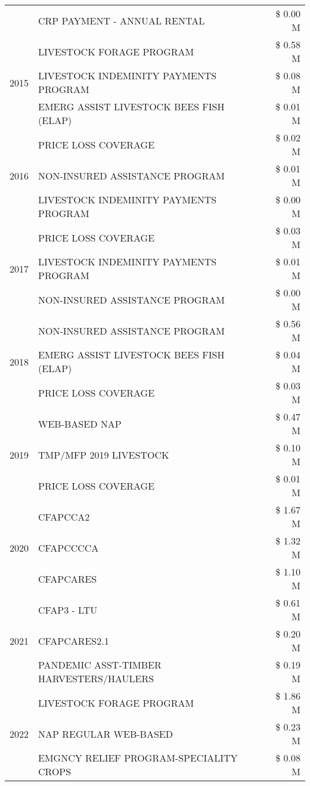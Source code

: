 \begin{tabular}{llr}
 & CRP PAYMENT - ANNUAL RENTAL & \$ 0.00 M \\
\cline{1-3}
\multirow[t]{3}{*}{2015} & LIVESTOCK FORAGE PROGRAM & \$ 0.58 M \\
 & LIVESTOCK INDEMINITY PAYMENTS PROGRAM & \$ 0.08 M \\
 & EMERG ASSIST LIVESTOCK BEES FISH (ELAP) & \$ 0.01 M \\
\cline{1-3}
\multirow[t]{3}{*}{2016} & PRICE LOSS COVERAGE & \$ 0.02 M \\
 & NON-INSURED ASSISTANCE PROGRAM & \$ 0.01 M \\
 & LIVESTOCK INDEMINITY PAYMENTS PROGRAM & \$ 0.00 M \\
\cline{1-3}
\multirow[t]{3}{*}{2017} & PRICE LOSS COVERAGE & \$ 0.03 M \\
 & LIVESTOCK INDEMINITY PAYMENTS PROGRAM & \$ 0.01 M \\
 & NON-INSURED ASSISTANCE PROGRAM & \$ 0.00 M \\
\cline{1-3}
\multirow[t]{3}{*}{2018} & NON-INSURED ASSISTANCE PROGRAM & \$ 0.56 M \\
 & EMERG ASSIST LIVESTOCK BEES FISH (ELAP) & \$ 0.04 M \\
 & PRICE LOSS COVERAGE & \$ 0.03 M \\
\cline{1-3}
\multirow[t]{3}{*}{2019} & WEB-BASED NAP & \$ 0.47 M \\
 & TMP/MFP 2019 LIVESTOCK & \$ 0.10 M \\
 & PRICE LOSS COVERAGE & \$ 0.01 M \\
\cline{1-3}
\multirow[t]{3}{*}{2020} & CFAPCCA2 & \$ 1.67 M \\
 & CFAPCCCCA & \$ 1.32 M \\
 & CFAPCARES & \$ 1.10 M \\
\cline{1-3}
\multirow[t]{3}{*}{2021} & CFAP3 - LTU & \$ 0.61 M \\
 & CFAPCARES2.1 & \$ 0.20 M \\
 & PANDEMIC ASST-TIMBER HARVESTERS/HAULERS & \$ 0.19 M \\
\cline{1-3}
\multirow[t]{3}{*}{2022} & LIVESTOCK FORAGE PROGRAM & \$ 1.86 M \\
 & NAP REGULAR WEB-BASED & \$ 0.23 M \\
 & EMGNCY RELIEF PROGRAM-SPECIALITY CROPS & \$ 0.08 M \\
\cline{1-3}
\bottomrule
\end{tabular}
